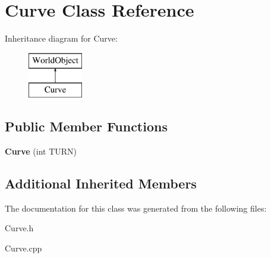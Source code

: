 \hypertarget{class_curve}{\section{Curve Class Reference}
\label{class_curve}
}
Inheritance diagram for Curve\+:\begin{figure}[H]
\begin{center}
\leavevmode
\includegraphics[height=2.000000cm]{class_curve}
\end{center}
\end{figure}
\subsection*{Public Member Functions}
\begin{DoxyCompactItemize}
\item 
\hypertarget{class_curve_a25ea22fdfb1642309a758bf05829b77e}{{\bfseries Curve} (int T\+U\+R\+N)}\label{class_curve_a25ea22fdfb1642309a758bf05829b77e}

\end{DoxyCompactItemize}
\subsection*{Additional Inherited Members}


The documentation for this class was generated from the following files\+:\begin{DoxyCompactItemize}
\item 
Curve.\+h\item 
Curve.\+cpp\end{DoxyCompactItemize}
